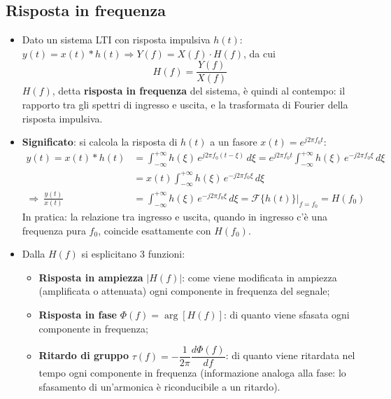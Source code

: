 \documentclass[12pt, a4paper]{article}
\begin{document}
\subsection{Risposta in frequenza}
\begin{itemize}
    \item Dato un sistema LTI con risposta impulsiva $h(t)$: $y(t)=x(t)*h(t) \Rightarrow Y(f)=X(f)\cdot H(f)$, da cui
    $$H(f)=\frac{Y(f)}{X(f)}$$
    $H(f)$, detta \textbf{risposta in frequenza} del sistema, è quindi al contempo: il rapporto tra gli spettri di ingresso e uscita, e la trasformata di Fourier della risposta impulsiva.
    \item \textbf{Significato}: si calcola la risposta di $h(t)$ a un fasore $x(t)=e^{j2\pi f_0t}$:
    \begin{align*}
        y(t)=x(t)*h(t) &= \int_{-\infty}^{+\infty} h(\xi)\,e^{j2\pi f_0(t-\xi)}\,d\xi = e^{j2\pi f_0t}\int_{-\infty}^{+\infty} h(\xi)\,e^{-j2\pi f_0\xi}\,d\xi \\
        &= x(t)\int_{-\infty}^{+\infty} h(\xi)\,e^{-j2\pi f_0\xi}\,d\xi \\
        \Longrightarrow\ \frac{y(t)}{x(t)} &= \int_{-\infty}^{+\infty} h(\xi)\,e^{-j2\pi f_0\xi}\,d\xi = \mathcal{F}\{h(t)\}\Big|_{f=f_0} = H(f_0)
    \end{align*}
    In pratica: la relazione tra ingresso e uscita, quando in ingresso c'è una frequenza pura $f_0$, coincide esattamente con $H(f_0)$.
    \item Dalla $H(f)$ si esplicitano 3 funzioni:
    \begin{itemize}
        \item \textbf{Risposta in ampiezza} $|H(f)|$: come viene modificata in ampiezza (amplificata o attenuata) ogni componente in frequenza del segnale;
        \item \textbf{Risposta in fase} $\Phi(f)=\arg[H(f)]$: di quanto viene sfasata ogni componente in frequenza;
        \item \textbf{Ritardo di gruppo} $\tau(f) = -\dfrac{1}{2\pi}\dfrac{d\Phi(f)}{df}$: di quanto viene ritardata nel tempo ogni componente in frequenza (informazione analoga alla fase: lo sfasamento di un'armonica è riconducibile a un ritardo).
    \end{itemize}
\end{itemize}
\end{document}

